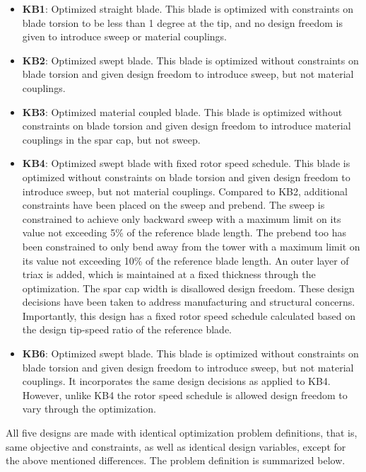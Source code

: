 \begin{itemize}
	\item \textbf{KB1}: Optimized straight blade. This blade is optimized with constraints on blade torsion to be less than 1 degree at the tip, and no design freedom is given to introduce sweep or material couplings.
	\item \textbf{KB2}: Optimized swept blade. This blade is optimized without constraints on blade torsion and given design freedom to introduce sweep, but not material couplings.
	\item \textbf{KB3}: Optimized material coupled blade. This blade is optimized without constraints on blade torsion and given design freedom to introduce material couplings in the spar cap, but not sweep.
	\item \textbf{KB4}: Optimized swept blade with fixed rotor speed schedule. This blade is optimized without constraints on blade torsion and given design freedom to introduce sweep, but not material couplings. Compared to KB2, additional constraints have been placed on the sweep and prebend. The sweep is constrained to achieve only backward sweep with a maximum limit on its value not exceeding 5\% of the reference blade length. The prebend too has been constrained to only bend away from the tower with a maximum limit on its value not exceeding 10\% of the reference blade length. An outer layer of triax is added, which is maintained at a fixed thickness through the optimization. The spar cap width is disallowed design freedom. These design decisions have been taken to address manufacturing and structural concerns. Importantly, this design has a fixed rotor speed schedule calculated based on the design tip-speed ratio of the reference blade. 
	\item \textbf{KB6}: Optimized swept blade. This blade is optimized without constraints on blade torsion and given design freedom to introduce sweep, but not material couplings. It incorporates the same design decisions as applied to KB4. However, unlike KB4 the rotor speed schedule is allowed design freedom to vary through the optimization. 
\end{itemize}

All five designs are made with identical optimization problem definitions, that is, same objective and constraints, as well as identical design variables, except for the above mentioned differences. The problem definition is summarized below.

